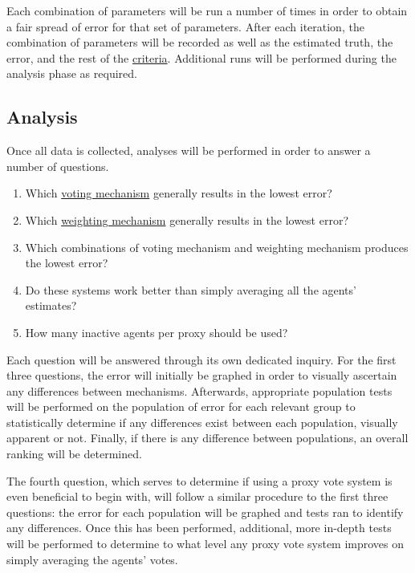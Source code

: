 Each combination of parameters will be run a number of times in order to obtain
a fair spread of error for that set of parameters.
After each iteration, the combination of parameters will be recorded as well
as the estimated truth, the error, and the rest of the
\hyperref[subsec:criteria]{criteria}.
Additional runs will be performed during the analysis phase as required.

\subsection{Analysis}\label{subsec:analysis}
Once all data is collected, analyses will be performed in order to answer a
number of questions.
\begin{enumerate}[label=\textbf{Q\arabic*}., leftmargin=2\parindent]
    \item Which \hyperref[subsec:voting-mechanisms]{voting mechanism}
    generally results in the lowest error?

    \item Which \hyperref[subsec:weighting-mechanisms]{weighting mechanism}
    generally results in the lowest error?

    \item Which combinations of voting mechanism and weighting mechanism
    produces the lowest error?

    \item Do these systems work better than simply averaging all the agents' estimates?

    \item How many inactive agents per proxy should be used?
\end{enumerate}

Each question will be answered through its own dedicated inquiry.
For the first three questions, the error will initially be graphed in order to
visually ascertain any differences between mechanisms.
Afterwards, appropriate population tests will be performed on the population of error
for each relevant group to statistically determine if any differences exist between
each population, visually apparent or not.
Finally, if there is any difference between populations, an overall ranking will be
determined.

The fourth question, which serves to determine if using a proxy vote system is even
beneficial to begin with, will follow a similar procedure to the first three
questions: the error for each population will be graphed and tests ran to identify
any differences.
Once this has been performed, additional, more in-depth tests will be performed to
determine to what level any proxy vote system improves on simply averaging the
agents' votes.

